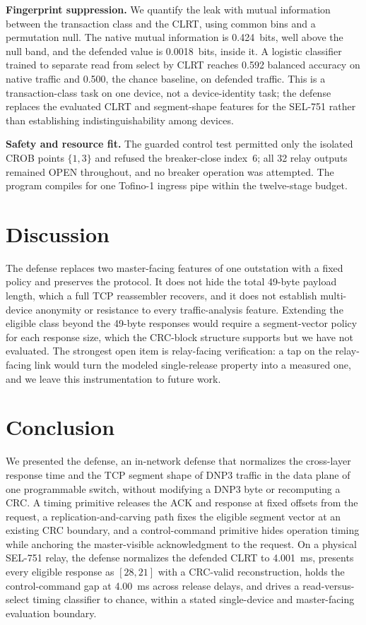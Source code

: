 \noindent\textbf{Fingerprint suppression.} We quantify the leak with mutual information between the
transaction class and the CLRT, using common bins and a permutation null. The native mutual information
is 0.424~bits, well above the null band, and the defended value is 0.0018~bits, inside it. A logistic
classifier trained to separate read from select by CLRT reaches 0.592 balanced accuracy on native
traffic and 0.500, the chance baseline, on defended traffic. This is a transaction-class task on one
device, not a device-identity task; the defense replaces the evaluated CLRT and segment-shape features
for the SEL-751 rather than establishing indistinguishability among devices.

\noindent\textbf{Safety and resource fit.} The guarded control test permitted only the isolated CROB
points $\{1,3\}$ and refused the breaker-close index~6; all 32 relay outputs remained OPEN throughout,
and no breaker operation was attempted. The program compiles for one Tofino-1 ingress pipe within the
twelve-stage budget.

\section{Discussion}
\label{sec:disc}

The defense replaces two master-facing features of one outstation with a fixed policy and preserves the
protocol. It does not hide the total 49-byte payload length, which a full TCP reassembler recovers,
and it does not establish multi-device anonymity or resistance to every traffic-analysis feature.
Extending the eligible class beyond the 49-byte responses would require a segment-vector policy for
each response size, which the CRC-block structure supports but we have not evaluated. The strongest
open item is relay-facing verification: a tap on the relay-facing link would turn the modeled
single-release property into a measured one, and we leave this instrumentation to future work.

\section{Conclusion}
\label{sec:concl}

We presented the defense, an in-network defense that normalizes the cross-layer response time and the
TCP segment shape of DNP3 traffic in the data plane of one programmable switch, without modifying a
DNP3 byte or recomputing a CRC. A timing primitive releases the ACK and response at fixed offsets from
the request, a replication-and-carving path fixes the eligible segment vector at an existing CRC
boundary, and a control-command primitive hides operation timing while anchoring the master-visible
acknowledgment to the request. On a physical SEL-751 relay, the defense normalizes the defended CLRT to
4.001~ms, presents every eligible response as $[28,21]$ with a CRC-valid reconstruction, holds the
control-command gap at 4.00~ms across release delays, and drives a read-versus-select timing classifier
to chance, within a stated single-device and master-facing evaluation boundary.
